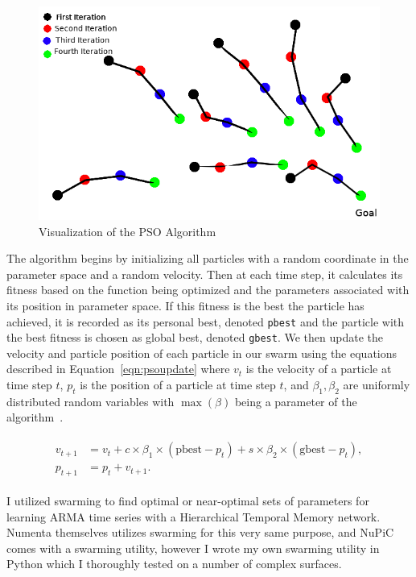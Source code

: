 \documentclass[oneside,12pt,openany]{book}
\begin{document}
	\begin{figure}[hbt!]
		\centering
		\includegraphics[width=.7\linewidth]{images/PSOVisual.png}
		\caption{Visualization of the PSO Algorithm}
		\label{fig:PSOVisual}
	\end{figure}
	
	The algorithm begins by initializing all particles with a random coordinate in the parameter space and a random velocity. Then at each time step, it calculates its fitness based on the function being optimized and the parameters associated with its position in parameter space. If this fitness is the best the particle has achieved, it is recorded as its personal best, denoted \texttt{pbest} and the particle with the best fitness is chosen as global best, denoted \texttt{gbest}. We then update the velocity and particle position of each particle in our swarm using the equations described in Equation~\eqref{eqn:psoupdate} where $v_{t}$ is the velocity of a particle at time step $t$, $p_{t}$ is the position of a particle at time step $t$, and $\beta_{1}, \beta_{2}$ are uniformly distributed random variables with $\max(\beta)$ being a parameter of the algorithm~\cite{PSOReview}.
	
	\begin{align}
	\label{eqn:psoupdate}
	\begin{split}
	v_{t+1} &= v_{t}+c\times \beta_{1} \times (\text{pbest}-p_{t})+s\times \beta_{2} \times (\text{gbest}-p_{t}), \\
	p_{t+1} &= p_{t} + v_{t+1} .
	\end{split}
	\end{align}
	
	I utilized swarming to find optimal or near-optimal sets of parameters for learning ARMA time series with a Hierarchical Temporal Memory network. Numenta themselves utilizes swarming for this very same purpose, and NuPiC comes with a swarming utility, however I wrote my own swarming utility in Python which I thoroughly tested on a number of complex surfaces.
	
\end{document}

